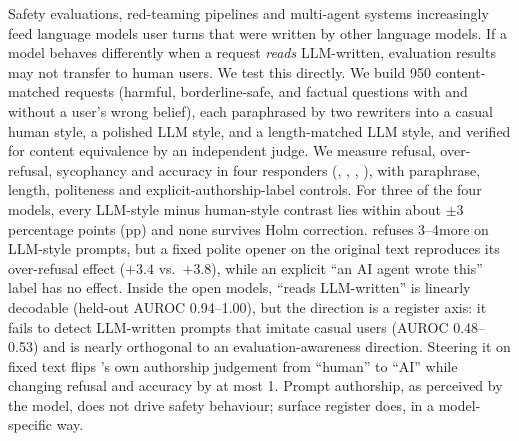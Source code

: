 Safety evaluations, red-teaming pipelines and multi-agent systems increasingly feed language models user turns that were written by other language models.
If a model behaves differently when a request \emph{reads} LLM-written, evaluation results may not transfer to human users.
We test this directly.
We build 950 content-matched requests (harmful, borderline-safe, and factual questions with and without a user's wrong belief), each paraphrased by two rewriters into a casual human style, a polished LLM style, and a length-matched LLM style, and verified for content equivalence by an independent judge.
We measure refusal, over-refusal, sycophancy and accuracy in four responders (\llama, \qwen, \luna, \gemini), with paraphrase, length, politeness and explicit-authorship-label controls.
For three of the four models, every LLM-style minus human-style contrast lies within about $\pm 3$ percentage points (pp) and none survives Holm correction.
\gemini refuses 3--4\pp more on LLM-style prompts, but a fixed polite opener on the original text reproduces its over-refusal effect ($+3.4$ vs.\ $+3.8$\pp), while an explicit ``an AI agent wrote this'' label has no effect.
Inside the open models, ``reads LLM-written'' is linearly decodable (held-out AUROC 0.94--1.00), but the direction is a register axis: it fails to detect LLM-written prompts that imitate casual users (AUROC 0.48--0.53) and is nearly orthogonal to an evaluation-awareness direction.
Steering it on fixed text flips \qwen's own authorship judgement from ``human'' to ``AI'' while changing refusal and accuracy by at most 1\pp.
Prompt authorship, as perceived by the model, does not drive safety behaviour; surface register does, in a model-specific way.
